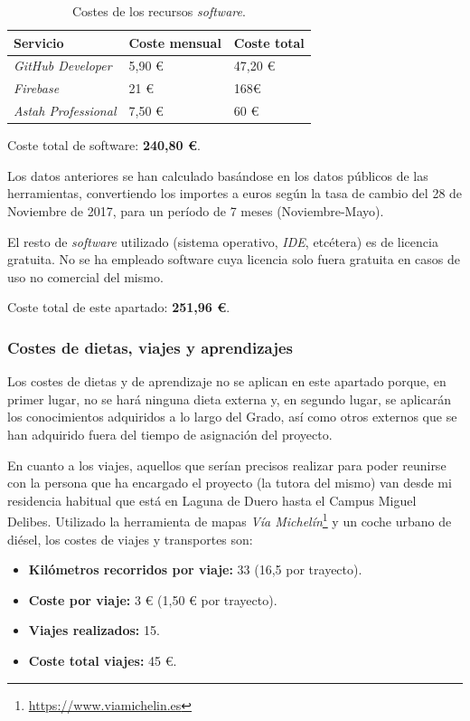 \documentclass[twoside]{report}
\begin{document}
\begin{table}[H]
\centering
\begin{tabular}{|l|l|l|}
\hline
Servicio         & Coste mensual & Coste total \\ \hline
\textit{GitHub Developer} & 5,90 \euro        & 47,20 \euro          \\ \hline
\textit{Firebase}         & 21 \euro      & 168\euro           \\ \hline
\textit{Astah Professional} & 7,50 \euro & 60 \euro \\ \hline
\end{tabular}
\caption{Costes de los recursos \textit{software}.}
\end{table}

Coste total de software: \textbf{240,80 \euro}.

Los datos anteriores se han calculado basándose en los datos públicos de las herramientas, convertiendo los importes a euros según la tasa de cambio del 28 de Noviembre de 2017, para un período de 7 meses (Noviembre-Mayo).

El resto de \textit{software} utilizado (sistema operativo, \textit{IDE}, etcétera) es de licencia gratuita. No se ha empleado software cuya licencia solo fuera gratuita en casos de uso no comercial del mismo.

Coste total de este apartado: \textbf{251,96 \euro}.

\subsubsection{Costes de dietas, viajes y aprendizajes}

Los costes de dietas y de aprendizaje no se aplican en este apartado porque, en primer lugar, no se hará ninguna dieta externa y, en segundo lugar, se aplicarán los conocimientos adquiridos a lo largo del Grado, así como otros externos que se han adquirido fuera del tiempo de asignación del proyecto.

En cuanto a los viajes, aquellos que serían precisos realizar para poder reunirse con la persona que ha encargado el proyecto (la tutora del mismo) van desde mi residencia habitual que está en Laguna de Duero hasta el Campus Miguel Delibes. Utilizado la herramienta de mapas \textit{Vía Michelín}\footnote{\url{https://www.viamichelin.es}} y un coche urbano de diésel, los costes de viajes y transportes son:

\begin{itemize}
\item \textbf{Kilómetros recorridos por viaje:} 33 (16,5 por trayecto).
\item \textbf{Coste por viaje:} 3 \euro \hspace{0.1cm} (1,50 \euro \hspace{0.1cm} por trayecto).
\item \textbf{Viajes realizados:} 15.
\item \textbf{Coste total viajes:} 45 \euro.
\end{itemize}
\end{document}
